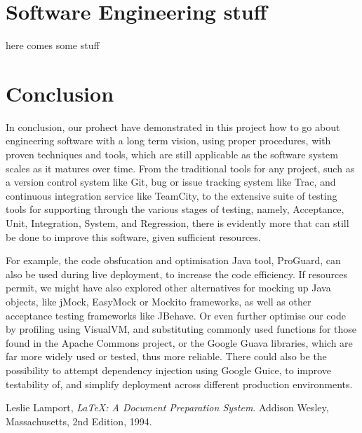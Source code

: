 \documentclass[11pt,twocolumn]{article} %
\begin{document}
\section{Software Engineering stuff}
here comes some stuff

\section{Conclusion}
In conclusion, our prohect have demonstrated in this project how to go about engineering software
with a long term vision, using proper procedures, with proven techniques and tools, which
are still applicable as the software system scales as it matures over time.
From the traditional tools for any project, such as a version control system like Git, bug
or issue tracking system like Trac, and continuous integration service like TeamCity, to
the extensive suite of testing tools for supporting through the various stages of testing,
namely, Acceptance, Unit, Integration, System, and Regression, there is evidently more
that can still be done to improve this software, given sufficient resources.

For example, the code obsfucation and optimisation Java tool, ProGuard, can also be used
during live deployment, to increase the code efficiency. If resources permit, we might have
also explored other alternatives for mocking up Java objects, like jMock, EasyMock or
Mockito frameworks, as well as other acceptance testing frameworks like JBehave.
Or even further optimise our code by profiling using VisualVM, and substituting commonly
used functions for those found in the Apache Commons project, or the Google Guava
libraries, which are far more widely used or tested, thus more reliable. There could also be
the possibility to attempt dependency injection using Google Guice, to improve testability
of, and simplify deployment across different production environments.

\pagebreak


\begin{thebibliography}{9}

  Leslie Lamport,
  \emph{\LaTeX: A Document Preparation System}.
  Addison Wesley, Massachusetts,
  2nd Edition,
  1994.

\end{thebibliography}
\end{document}
